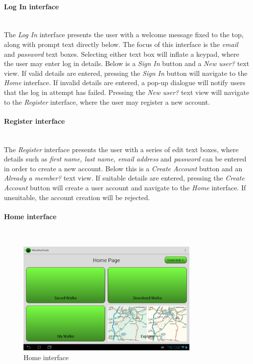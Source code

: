 \documentclass[11pt,a4paper]{report}
\begin{document}
\paragraph*{Log In interface}\mbox{}\\

The \emph{Log In} interface presents the user with a welcome message fixed to the top, along with prompt text directly below. The focus of this interface is the \emph{email} and \emph{password} text boxes. Selecting either text box will inflate a keypad, where the user may enter log in details. Below is a \emph{Sign In} button and a \emph{New user?} text view. If valid details are entered, pressing the \emph{Sign In} button will navigate to the \emph{Home} interface. If invalid details are entered, a pop-up dialogue will notify users that the log in attempt has failed. Pressing the \emph{New user?} text view will navigate to the \emph{Register} interface, where the user may register a new account.

\paragraph{Register interface}\mbox{}\\

The \emph{Register} interface presents the user with a series of edit text boxes, where details such as \emph{first name, last name, email address} and \emph{password} can be entered in order to create a new account. Below this is a \emph{Create Account} button and an \emph{Already a member?} text view. If suitable details are entered, pressing the \emph{Create Account} button will create a user account and navigate to the \emph{Home} interface. If unsuitable, the account creation will be rejected.

\paragraph*{Home interface}\mbox{}\\

\begin{figure}[H]
    \centering
    \includegraphics[width=0.8\textwidth]{chris/home}
    \caption{Home interface}
    \label{fig:home}
\end{figure}
\end{document}
